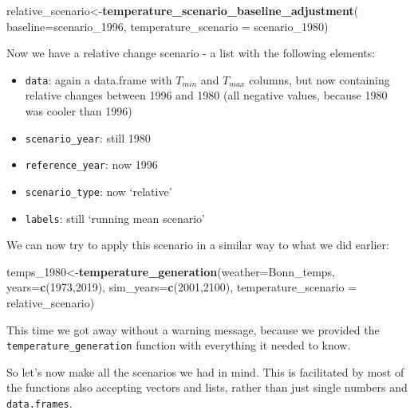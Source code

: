 \documentclass[
]{book}
\newenvironment{Shaded}{\begin{snugshade}}{\end{snugshade}}
\newcommand{\DataTypeTok}[1]{\textcolor[rgb]{0.13,0.29,0.53}{#1}}
\newcommand{\DecValTok}[1]{\textcolor[rgb]{0.00,0.00,0.81}{#1}}
\newcommand{\KeywordTok}[1]{\textcolor[rgb]{0.13,0.29,0.53}{\textbf{#1}}}
\newcommand{\NormalTok}[1]{#1}
\providecommand{\tightlist}{%
  \setlength{\itemsep}{0pt}\setlength{\parskip}{0pt}}
\begin{document}
\begin{Shaded}
\begin{Highlighting}[]
\NormalTok{relative_scenario<-}\KeywordTok{temperature_scenario_baseline_adjustment}\NormalTok{(}
  \DataTypeTok{baseline=}\NormalTok{scenario_}\DecValTok{1996}\NormalTok{,}
  \DataTypeTok{temperature_scenario =}\NormalTok{ scenario_}\DecValTok{1980}\NormalTok{)}
\end{Highlighting}
\end{Shaded}

Now we have a relative change scenario - a list with the following elements:

\begin{itemize}
\tightlist
\item
  \texttt{data}: again a data.frame with \(T_{min}\) and \(T_{max}\) columns, but now containing relative changes between 1996 and 1980 (all negative values, because 1980 was cooler than 1996)
\item
  \texttt{scenario\_year}: still 1980
\item
  \texttt{reference\_year}: now 1996
\item
  \texttt{scenario\_type}: now `relative'
\item
  \texttt{labels}: still `running mean scenario'
\end{itemize}

We can now try to apply this scenario in a similar way to what we did earlier:

\begin{Shaded}
\begin{Highlighting}[]
\NormalTok{temps_}\DecValTok{1980}\NormalTok{<-}\KeywordTok{temperature_generation}\NormalTok{(}\DataTypeTok{weather=}\NormalTok{Bonn_temps, }\DataTypeTok{years=}\KeywordTok{c}\NormalTok{(}\DecValTok{1973}\NormalTok{,}\DecValTok{2019}\NormalTok{),}
                                   \DataTypeTok{sim_years=}\KeywordTok{c}\NormalTok{(}\DecValTok{2001}\NormalTok{,}\DecValTok{2100}\NormalTok{),}
                                   \DataTypeTok{temperature_scenario =}\NormalTok{ relative_scenario)}
\end{Highlighting}
\end{Shaded}

This time we got away without a warning message, because we provided the \texttt{temperature\_generation} function with everything it needed to know.

So let's now make all the scenarios we had in mind. This is facilitated by most of the functions also accepting vectors and lists, rather than just single numbers and \texttt{data.frames}.
\end{document}
